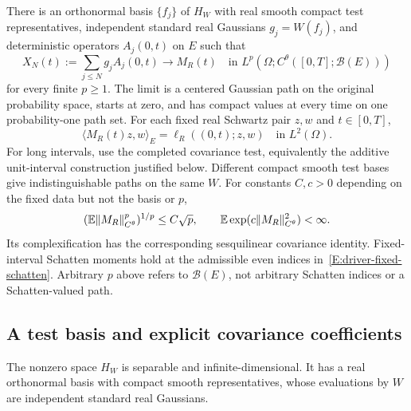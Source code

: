 \begin{proposition}\label{P:actual-operator-driver}
  There is an orthonormal basis $\{f_j\}$ of $H_W$ with real smooth compact test
  representatives, independent standard real Gaussians $g_j = W(f_j)$, and
  deterministic operators $A_j(0,t)$ on $E$ such that
  \begin{equation}\label{E:driver-path-convergence}
    X_N(t):=\sum_{j\le N}g_jA_j(0,t)\longrightarrow M_R(t)
    \quad\text{in }L^p(\Omega;C^\theta([0,T];\mathcal{B}(E)))
  \end{equation}
  for every finite $p \ge 1$. The limit is a centered Gaussian path on the
  original probability space, starts at zero, and has compact values at every
  time on one probability-one path set. For each fixed real Schwartz pair $z,w$
  and $t \in [0,T]$,
  \begin{equation}\label{E:driver-raw-row}
    \langle M_R(t)z,w\rangle_E=\ell_R((0,t);z,w)
    \quad\text{in }L^2(\Omega).
  \end{equation}
  For long intervals, use the completed covariance test, equivalently the
  additive unit-interval construction justified below. Different compact smooth
  test bases give indistinguishable paths on the same $W$. For constants $C,c >
  0$ depending on the fixed data but not the basis or $p$,
  \begin{equation}\label{E:driver-gaussian-norm}
    (\mathbb{E}\|M_R\|_{C^\theta}^p)^{1/p}\le C\sqrt p,\qquad
    \mathbb{E}\exp(c\|M_R\|_{C^\theta}^2)<\infty.
  \end{equation}
  Its complexification has the corresponding sesquilinear covariance identity.
  Fixed-interval Schatten moments hold at the admissible even indices
  in~\eqref{E:driver-fixed-schatten}. Arbitrary $p$ above refers to
  $\mathcal{B}(E)$, not arbitrary Schatten indices or a Schatten-valued path.
\end{proposition}

\subsection{A test basis and explicit covariance coefficients}

\begin{lemma}\label{L:driver-noise-basis}
  The nonzero space $H_W$ is separable and infinite-dimensional. It has a real
  orthonormal basis with compact smooth representatives, whose evaluations by
  $W$ are independent standard real Gaussians.
\end{lemma}

